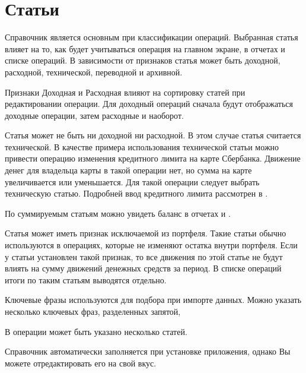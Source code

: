 \documentclass[a4paper,10pt,russian]{sphinxmanual}
\begin{document}
\section{Статьи}
\label{\detokenize{directories:id5}}
Справочник  является основным при классификации операций. Выбранная статья влияет на то, как будет учитываться
операция на главном экране, в отчетах и списке операций. В зависимости от признаков статья может быть доходной, расходной,
технической, переводной и архивной.

Признаки Доходная и Расходная влияют на сортировку статей при редактировании операции. Для доходный операций сначала
будут отображаться доходные операции, затем расходные и наоборот.

Статья может не быть ни доходной ни расходной. В этом случае статья считается технической. В качестве примера использования
технической статьи можно привести операцию изменения кредитного лимита на карте Сбербанка.
Движение денег для владельца карты в такой операции нет, но сумма на карте увеличивается или уменьшается.
Для такой операции следует выбрать техническую статью. Подробней  ввод кредитного лимита
рассмотрен в .

По суммируемым статьям можно увидеть баланс в отчетах  и .

Статья может иметь признак исключаемой из портфеля. Такие статьи обычно используются в операциях,
которые не изменяют остатка внутри портфеля. Если у статьи установлен такой признак,
то все движения по этой статье не будут влиять на сумму движений денежных средств за период.
В списке операций итоги по таким статьям выводятся отдельно.

Ключевые фразы используются для подбора при импорте данных. Можно указать несколько ключевых фраз, разделенных запятой,

В операции может быть указано несколько статей.

Справочник автоматически заполняется при установке приложения, однако Вы можете отредактировать его на свой вкус.
\end{document}

